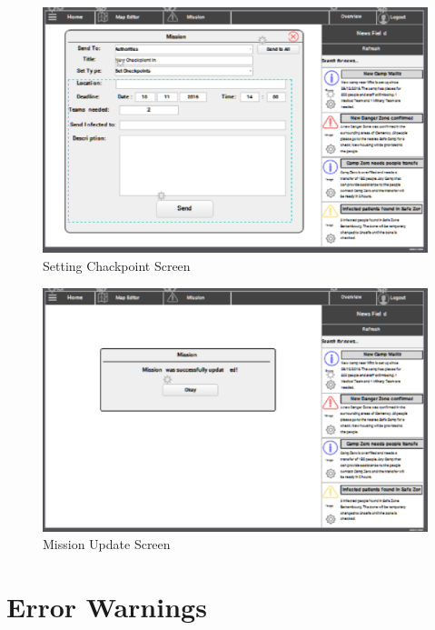 \begin{figure}[htbp]
\begin{center}
 \caption{\label{fig:W15} Setting Chackpoint Screen}
   \includegraphics[width=150mm]{./images/Web/ccheckpointsc.eps}
\end{center}
\end{figure}
\begin{figure}[htbp]
\begin{center}
 \caption{\label{fig:W14} Mission Update Screen}
   \includegraphics[width=150mm]{./images/Web/cupdatescreen.eps}
\end{center}
\end{figure}


\section{Error Warnings}
\label{sec:ErrorWarnings}
